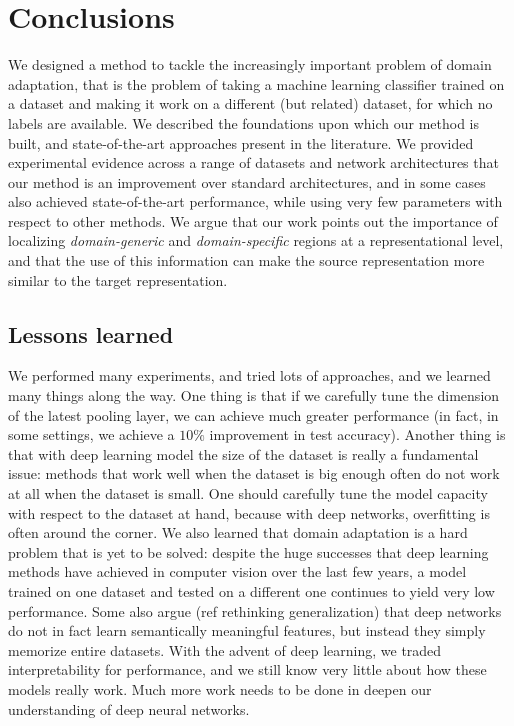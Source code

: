 \documentclass[../main.tex]{subfiles}
\begin{document}
    \chapter{Conclusions}\label{chap:summary}

    We designed a method to tackle the increasingly important problem of domain adaptation,
    that is the problem of taking a machine learning classifier trained on a dataset and making it work
    on a different (but related) dataset, for which no labels are available. We described the foundations
    upon which our method is built, and state-of-the-art approaches present in the literature. We provided
    experimental evidence across a range of datasets and network architectures that our method is an
    improvement over standard architectures, and in some cases also achieved state-of-the-art performance,
    while using very few parameters with respect to other methods. We argue that our work points out the
    importance of localizing \textit{domain-generic} and \textit{domain-specific} regions at a representational
    level, and that the use of this information can make the source representation more similar to the target
    representation.

    \section{Lessons learned}
    We performed many experiments, and tried lots of approaches, and we learned many things along the way.
    One thing is that if we carefully tune the dimension of the latest pooling layer, we can achieve much
    greater performance (in fact, in some settings, we achieve a $10\%$ improvement in test accuracy).
    Another thing is that with deep learning model the size of the dataset is really a fundamental issue:
    methods that work well when the dataset is big enough often do not work at all when the dataset is
    small. One should carefully tune the model capacity with respect to the dataset at hand, because with
    deep networks, overfitting is often around the corner.
    We also learned that domain adaptation is a hard problem that is yet to be solved: despite the huge
    successes that deep learning methods have achieved in computer vision over the last few years, a model
    trained on one dataset and tested on a different one continues to yield very low performance. Some
    also argue (ref rethinking generalization) that deep networks do not in fact learn semantically
    meaningful features, but instead they simply memorize entire datasets. With the advent of deep learning,
    we traded interpretability for performance, and we still know very little about how these models really work.
    Much more work needs to be done in deepen our understanding of deep neural networks.
\end{document}
